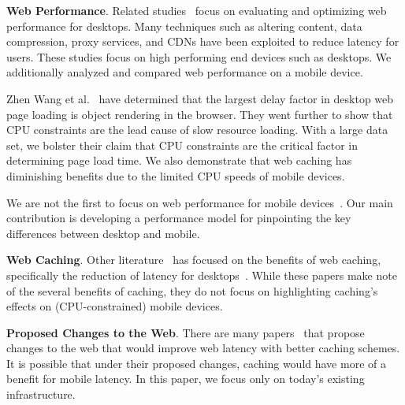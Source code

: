 \textbf{Web Performance}. Related studies~\cite{web-perf-2, web-perf-3} focus
on evaluating and optimizing web performance for desktops. Many techniques
such as altering content, data compression, proxy services, and CDNs have been
exploited to reduce latency for users. These studies focus on high performing
end devices such as desktops. We additionally analyzed and compared web performance on a mobile device.

Zhen Wang et al.~\cite{CPU-plt-2, CPU-plt-3} have determined that the largest delay factor in desktop web page loading is object rendering in the browser. They went further to show that CPU constraints are the lead cause of slow resource loading.
With a large data set, we bolster their claim that CPU constraints are the critical factor in determining page load time. We also demonstrate that web caching has diminishing benefits due to the limited CPU speeds of mobile devices.

We are not the first to focus on web performance for mobile
devices~\cite{CPU-plt-2, CPU-plt-3}.
Our main contribution is developing a performance model for pinpointing the key differences between desktop
and mobile.

\textbf{Web Caching}. Other literature~\cite{web-caching-1, web-caching-2, web-caching-8, web-caching-9} has focused on the benefits of web caching, specifically the reduction of latency for desktops~\cite{web-caching-3, web-caching-4, web-caching-5, web-caching-6, web-caching-7}.
While these papers make note of the several benefits of caching, they do not
focus on highlighting caching's effects on (CPU-constrained) mobile devices.


\textbf{Proposed Changes to the Web}. There are many
papers~\cite{web-perf-4-new-design, web-caching-4-new-design,
web-caching-5-new-design, web-caching-latency-1-new-design,
web-caching-latency-2-new-design, web-caching-latency-3-new-design,
web-caching-latency-5-new-design, web-caching-latency-6-new-design,
web-caching-latency-7-new-design} that propose changes to the web that would
improve web latency with better caching schemes. It is possible that under their proposed changes, caching would have more of a benefit for mobile latency. In this paper, we focus only on today's existing infrastructure. %

